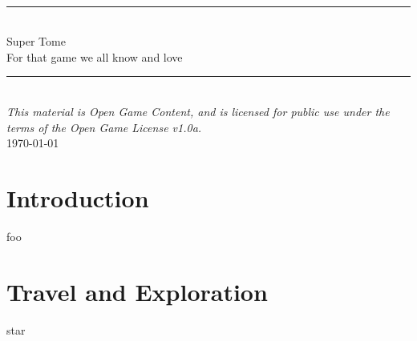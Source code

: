 \documentclass[12pt,twoside,onecolumn,openany,final]{memoir}
\begin{document}
\thispagestyle{empty}
\begin{center}
\textsc{\Large}\\[0.25cm]
\rule{\linewidth}{0.5mm} \\[0.70cm]
\fontsize{30}{30} \selectfont Super Tome\\[.30cm]
\fontsize{16}{18} \selectfont \guillemotleft{} For that game we all know and love \guillemotright{}\\
\rule{\linewidth}{0.5mm} \\[0.6cm]
\vfill
\footnotesize{\textit{This material is Open Game Content, and is licensed for public use under the terms of the Open Game License v1.0a.}}\\
\normalsize{\today}
\end{center}

\pagebreak
\sffamily
\pagestyle{plain}
\raggedbottom

\renewcommand{\contentsname}{Table of Contents}
\setcounter{tocdepth}{1}
\small{\tableofcontents}



\clearpage
\chapter{Introduction}
foo








\chapter{Travel and Exploration}
star
\end{document}
